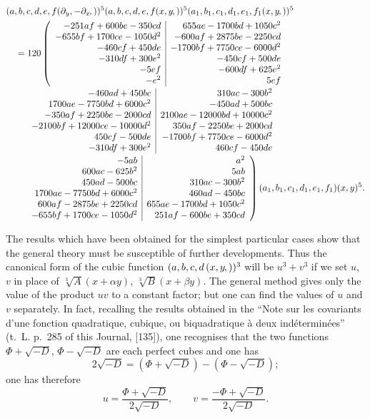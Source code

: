 \documentclass[11pt,a4paper]{article}
\newcommand{\fcn}[2]{(#1\kern-1pt, #2)}
\begin{document}
\[
\begin{aligned}
&(a,b,c,d,e,f\fcn{\partial_y,-\partial_x})^5
 (a,b,c,d,e,f\fcn{x,y})^5
 (a_1,b_1,c_1,d_1,e_1,f_1\fcn{x,y})^5\\
&\quad =
120\left(
\begin{array}{r|r}
  -251af+600be-350cd
    & 655ae-1700bd+1050c^2\\
  -655bf+1700ce-1050d^2
    & -600af+2875be-2250cd\\
  -460cf+450de
    & -1700bf+7750ce-6000d^2\\
  -310df+300e^2
    & -450cf+500de\\
  -5ef
    & -600df+625e^2\\
  -e^2
    & 5ef
\end{array}
\right.\\[-0.2em]
&\qquad\left.
\begin{array}{r|r}
  -460ad+450bc
    & 310ac-300b^2\\
  1700ae-7750bd+6000c^2
    & -450ad+500bc\\
  -350af+2250be-2000cd
    & 2100ae-12000bd+10000c^2\\
  -2100bf+12000ce-10000d^2
    & 350af-2250be+2000cd\\
  450cf-500de
    & -1700bf+7750ce-6000d^2\\
  -310df+300e^2
    & 460cf-450de
\end{array}
\right.\\[-0.2em]
&\qquad\left.
\begin{array}{r|r}
  -5ab
    & a^2\\
  600ac-625b^2
    & 5ab\\
  450ad-500bc
    & 310ac-300b^2\\
  1700ae-7750bd+6000c^2
    & 460ad-450bc\\
  600af-2875be+2250cd
    & 655ae-1700bd+1050c^2\\
  -655bf+1700ce-1050d^2
    & 251af-600be+350cd
\end{array}
\right)(a_1,b_1,c_1,d_1,e_1,f_1)(x,y)^5 .
\end{aligned}
\]
\endgroup

The results which have been obtained for the simplest particular cases show that
the general theory must be susceptible of further developments. Thus the canonical
form of the cubic function $(a,b,c,d\,\fcn{x,y})^3$ will be $u^3 + v^3$ if we set
$u$, $v$ in place of $\sqrt[3]{A}(x+\alpha y)$, $\sqrt[3]{B}(x+\beta y)$.
The general method gives only the value of the product $uv$ to a constant factor; but
one can find the values of $u$ and $v$ separately. In fact, recalling the results
obtained in the ``Note sur les covariants d'une fonction quadratique, cubique, ou
biquadratique \`a deux ind\'etermin\'ees'' (t.~L. p.~285 of this Journal, [135]), one
recognises that the two functions $\Phi+\sqrt{-D}$, $\Phi-\sqrt{-D}$ are each
perfect cubes and one has
\[
2\sqrt{-D} = (\Phi+\sqrt{-D}) - (\Phi-\sqrt{-D});
\]
one has therefore
\[
u = \frac{\Phi+\sqrt{-D}}{2\sqrt{-D}}, \qquad v = \frac{-\Phi+\sqrt{-D}}{2\sqrt{-D}}.
\]
\end{document}
